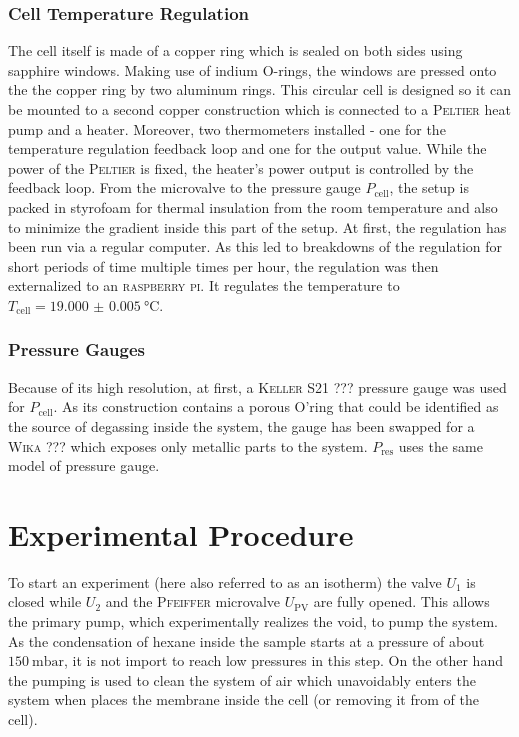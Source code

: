 \documentclass[../thesis.tex]{subfiles}
\begin{document}
            \subsubsection{Cell Temperature Regulation}
            \label{subsec:tcell-regulation}

                The cell itself is made of a copper ring which is sealed on both sides using sapphire windows. Making use of indium O-rings, the windows are pressed onto the the copper ring by two aluminum rings. This circular cell is designed so it can be mounted to a second copper construction which is connected to a \textsc{Peltier} heat pump and a heater. Moreover, two thermometers installed - one for the temperature regulation feedback loop and one for the output value. While the power of the \textsc{Peltier} is fixed, the heater's power output is controlled by the feedback loop. From the microvalve to the pressure gauge $P_\mathrm{cell}$, the setup is packed in styrofoam for thermal insulation from the room temperature and also to minimize the gradient inside this part of the setup. At first, the regulation has been run via a regular computer. As this led to breakdowns of the regulation for short periods of time multiple times per hour,  the regulation was then externalized to an \textsc{raspberry pi}. It regulates the temperature to $T_\mathrm{cell}=\SI{19.000(5)}{\celsius}$.


            \subsubsection{Pressure Gauges}

                Because of its high resolution, at first, a \textsc{Keller} S21 ??? pressure gauge was used for $P_\mathrm{cell}$. As its construction contains a porous O'ring that could be identified as the source of degassing inside the system, the gauge has been swapped for a \textsc{Wika} ??? which exposes only metallic parts to the system. $P_\mathrm{res}$ uses the same model of pressure gauge.


    \section{Experimental Procedure}
            \label{sec:experimental-procedure}

                To start an experiment (here also referred to as an isotherm) the valve $U_1$ is closed while $U_2$ and the \textsc{Pfeiffer} microvalve $U_\mathrm{PV}$ are fully opened. This allows the primary pump, which experimentally realizes the void, to pump the system. As the condensation of hexane inside the sample starts at a pressure of about $\SI{150}{\milli\bar}$, it is not import to reach low pressures in this step. On the other hand the pumping is used to clean the system of air which unavoidably enters the system when places the membrane inside the cell (or removing it from of the cell).\\
\end{document}
